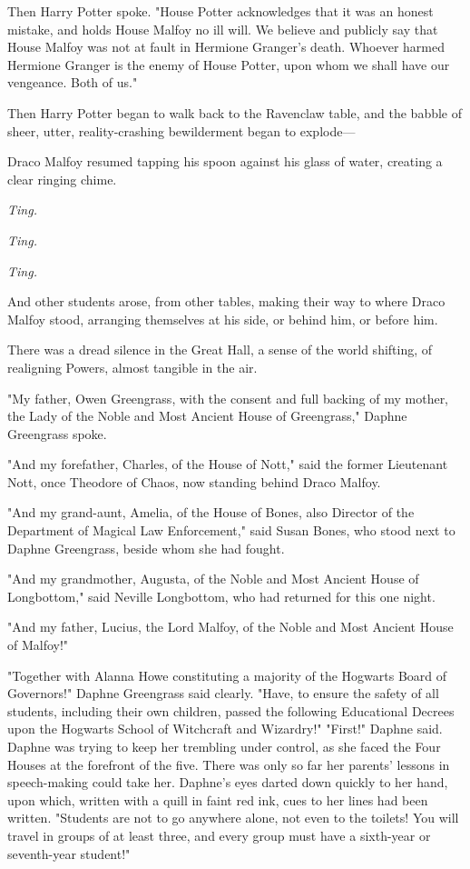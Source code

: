 Then Harry Potter spoke. "House Potter acknowledges that it was an honest
mistake, and holds House Malfoy no ill will. We believe and publicly say that
House Malfoy was not at fault in Hermione Granger's death. Whoever harmed
Hermione Granger is the enemy of House Potter, upon whom we shall have our
vengeance. Both of us."

Then Harry Potter began to walk back to the Ravenclaw table, and the babble of
sheer, utter, reality-crashing bewilderment began to explode---

Draco Malfoy resumed tapping his spoon against his glass of water, creating a clear
ringing chime.

\emph{Ting.}

\emph{Ting.}

\emph{Ting.}

And other students arose, from other tables, making their way to where Draco
Malfoy stood, arranging themselves at his side, or behind him, or before him.

There was a dread silence in the Great Hall, a sense of the world shifting, of
realigning Powers, almost tangible in the air.

"My father, Owen Greengrass, with the consent and full backing of my mother,
the Lady of the Noble and Most Ancient House of Greengrass," Daphne Greengrass
spoke.

"And my forefather, Charles, of the House of Nott," said the former Lieutenant
Nott, once Theodore of Chaos, now standing behind Draco Malfoy.

"And my grand-aunt, Amelia, of the House of Bones, also Director of the
Department of Magical Law Enforcement," said Susan Bones, who stood next to
Daphne Greengrass, beside whom she had fought.

"And my grandmother, Augusta, of the Noble and Most Ancient House of
Longbottom," said Neville Longbottom, who had returned for this one night.

"And my father, Lucius, the Lord Malfoy, of the Noble and Most Ancient House of
Malfoy!"

"Together with Alanna Howe constituting a majority of the Hogwarts Board of
Governors!" Daphne Greengrass said clearly. "Have, to ensure the safety of all
students, including their own children, passed the following Educational
Decrees upon the Hogwarts School of Witchcraft and Wizardry!"
\sbreak
"First!" Daphne said. Daphne was trying to keep her trembling under control, as
she faced the Four Houses at the forefront of the five. There was only so far
her parents' lessons in speech-making could take her. Daphne's eyes darted down
quickly to her hand, upon which, written with a quill in faint red ink, cues to
her lines had been written. "Students are not to go anywhere alone, not even to
the toilets! You will travel in groups of at least three, and every group must
have a sixth-year or seventh-year student!"

